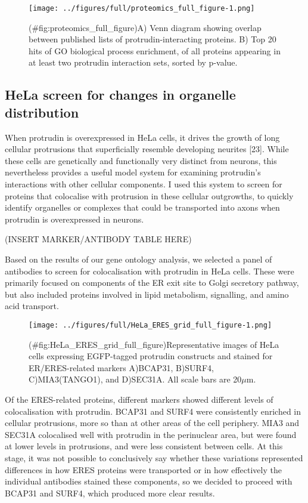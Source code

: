 \documentclass[
  12pt,
  a4paper,
]{book}
\begin{document}
\begin{figure}
\centering
\texttt{[image: ../figures/full/proteomics\_full\_figure-1.png]}
\caption{(\#fig:proteomics\_full\_figure)A) Venn diagram showing overlap between published lists of protrudin-interacting proteins. B) Top 20 hits of GO biological process enrichment, of all proteins appearing in at least two protrudin interaction sets, sorted by p-value.}
\end{figure}

\hypertarget{hela-screen-for-changes-in-organelle-distribution}{%
\subsection{HeLa screen for changes in organelle distribution}\label{hela-screen-for-changes-in-organelle-distribution}}

When protrudin is overexpressed in HeLa cells, it drives the growth of long cellular protrusions that superficially resemble developing neurites {[}23{]}. While these cells are genetically and functionally very distinct from neurons, this nevertheless provides a useful model system for examining protrudin's interactions with other cellular components. I used this system to screen for proteins that colocalise with protrusion in these cellular outgrowths, to quickly identify organelles or complexes that could be transported into axons when protrudin is overexpressed in neurons.

(INSERT MARKER/ANTIBODY TABLE HERE)

Based on the results of our gene ontology analysis, we selected a panel of antibodies to screen for colocalisation with protrudin in HeLa cells. These were primarily focused on components of the ER exit site to Golgi secretory pathway, but also included proteins involved in lipid metabolism, signalling, and amino acid transport.

\begin{figure}
\centering
\texttt{[image: ../figures/full/HeLa\_ERES\_grid\_full\_figure-1.png]}
\caption{(\#fig:HeLa\_ERES\_grid\_full\_figure)Representative images of HeLa cells expressing EGFP-tagged protrudin constructs and stained for ER/ERES-related markers A)BCAP31, B)SURF4, C)MIA3(TANGO1), and D)SEC31A. All scale bars are 20\(\mu\)m.}
\end{figure}

Of the ERES-related proteins, different markers showed different levels of colocalisation with protrudin. BCAP31 and SURF4 were consistently enriched in cellular protrusions, more so than at other areas of the cell periphery. MIA3 and SEC31A colocalised well with protrudin in the perinuclear area, but were found at lower levels in protrusions, and were less consistent between cells. At this stage, it was not possible to conclusively say whether these variations represented differences in how ERES proteins were transported or in how effectively the individual antibodies stained these components, so we decided to proceed with BCAP31 and SURF4, which produced more clear results.
\end{document}
